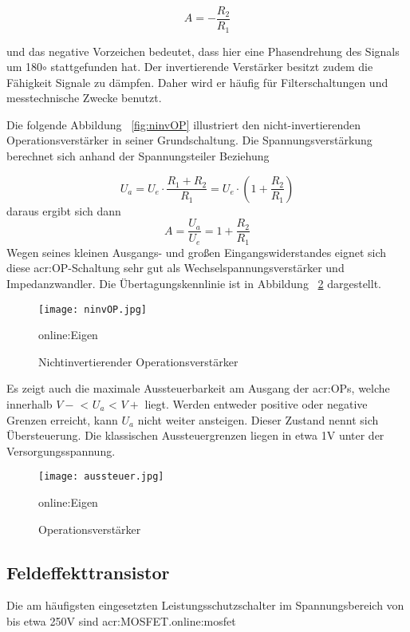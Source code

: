 \begin{equation}
	\label{equ:bsp1}
	A = - \frac{R_{2}}{R_{1}}
\end{equation}

und das negative Vorzeichen bedeutet, dass hier eine Phasendrehung des Signals um 180$\circ$ stattgefunden hat. Der invertierende Verstärker besitzt zudem die Fähigkeit Signale zu dämpfen. Daher wird er häufig für Filterschaltungen und messtechnische Zwecke benutzt. 

Die folgende Abbildung ~\ref{fig:ninvOP} illustriert den nicht-invertierenden Operationsverstärker in seiner Grundschaltung. Die Spannungsverstärkung berechnet sich anhand der Spannungsteiler Beziehung

\begin{equation}
	\label{equ:bsp1}
	U_{a} = U_{e} \cdot \frac{R_{1} + R_{2}}{R_{1}} = U_{e} \cdot (1+ \frac{R_{2}}{R_{1}})
\end{equation}
daraus ergibt sich dann
\begin{equation}
	\label{equ:bsp1}
	A = \frac{U_{a}}{U_{e}} = 1+ \frac{R_{2}}{R_{1}}
\end{equation}
Wegen seines kleinen Ausgangs- und großen Eingangswiderstandes eignet sich diese \gls{acr:OP}-Schaltung sehr gut als  Wechselspannungsverstärker und Impedanzwandler. Die Übertagungskennlinie ist in Abbildung ~\ref{fig:aussteuer} dargestellt. 

\begin{figure}[H]
	\centering
	\texttt{[image: ninvOP.jpg]}
	\caption[Nichtinvertierender Operationsverstärker]{Nichtinvertierender Operationsverstärker} 
	\gls{online:Eigen}
	\label{fig:invOP}
\end{figure}

Es zeigt auch die maximale Aussteuerbarkeit am Ausgang der \gls{acr:OP}s, welche innerhalb $V-$ < $U_{a}$ < $V+$ liegt. Werden entweder positive oder negative Grenzen erreicht, kann $U_{a}$ nicht weiter ansteigen. Dieser Zustand nennt sich Übersteuerung. Die klassischen Aussteuergrenzen liegen in etwa 1V unter der Versorgungsspannung.\cite{OP}

\begin{figure}[H]
	\centering
	\texttt{[image: aussteuer.jpg]}
	\caption[Operationsverstärker]{Operationsverstärker} 
	\gls{online:Eigen}
	\label{fig:aussteuer}
\end{figure} 

\newpage
\subsection{Feldeffekttransistor}
\label{subsec:Unterabschnitt12}
Die am häufigsten eingesetzten Leistungsschutzschalter im Spannungsbereich von bis etwa 250V sind \gls{acr:MOSFET}.\gls{online:mosfet}


